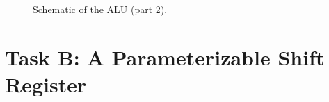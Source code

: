 \documentclass[10pt]{article}
\begin{document}
\begin{figure}[h!t]
    \centering
    \caption{Schematic of the ALU (part 2).}
    \label{fig:Schematic of Sequential Elements}
\end{figure}


\newpage


\section{Task B: A Parameterizable Shift Register}
\end{document}
